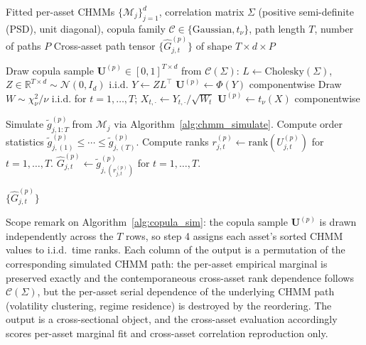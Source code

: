 \begin{algorithm}[tp]
\caption{Cross-asset copula simulation via rank reordering}
\label{alg:copula_sim}
\small
\begin{algorithmic}[1]
\REQUIRE Fitted per-asset CHMMs $\{\mathcal{M}_j\}_{j=1}^d$, correlation matrix $\Sigma$ (positive semi-definite (PSD), unit diagonal), copula family $\mathcal{C} \in \{\text{Gaussian}, t_\nu\}$, path length $T$, number of paths $P$
\ENSURE Cross-asset path tensor $\{\hat{G}^{(p)}_{j,t}\}$ of shape $T \times d \times P$


    \STATE Draw copula sample $\mathbf{U}^{(p)} \in [0,1]^{T \times d}$ from $\mathcal{C}(\Sigma)$:
    \STATE \quad $L \leftarrow \text{Cholesky}(\Sigma)$, \; $Z \in \mathbb{R}^{T \times d} \sim \mathcal{N}(0, I_d)$ i.i.d.
    \STATE \quad $Y \leftarrow Z L^\top$
        \STATE \quad $\mathbf{U}^{(p)} \leftarrow \Phi(Y)$ componentwise
    \ELSE
        \STATE \quad Draw $W \sim \chi^2_\nu / \nu$ i.i.d. for $t = 1, \dots, T$; \; $X_{t,\cdot} \leftarrow Y_{t,\cdot} / \sqrt{W_t}$
        \STATE \quad $\mathbf{U}^{(p)} \leftarrow t_\nu(X)$ componentwise
    \ENDIF

        \STATE Simulate $\tilde{g}_{j,1:T}^{(p)}$ from $\mathcal{M}_j$ via Algorithm~\ref{alg:chmm_simulate}.
        \STATE Compute order statistics $\tilde{g}_{j,(1)}^{(p)} \leq \cdots \leq \tilde{g}_{j,(T)}^{(p)}$.
        \STATE Compute ranks $r_{j,t}^{(p)} \leftarrow \text{rank}(U_{j,t}^{(p)})$ for $t = 1, \dots, T$.
        \STATE $\hat{G}_{j,t}^{(p)} \leftarrow \tilde{g}_{j,(r_{j,t}^{(p)})}^{(p)}$ for $t = 1, \dots, T$.
    \ENDFOR
\ENDFOR

\RETURN $\{\hat{G}^{(p)}_{j,t}\}$
\end{algorithmic}
\end{algorithm}

Scope remark on Algorithm~\ref{alg:copula_sim}: the copula sample $\mathbf{U}^{(p)}$ is drawn independently across the $T$ rows, so step 4 assigns each asset's sorted CHMM values to i.i.d.\ time ranks. Each column of the output is a permutation of the corresponding simulated CHMM path: the per-asset empirical marginal is preserved exactly and the contemporaneous cross-asset rank dependence follows $\mathcal{C}(\Sigma)$, but the per-asset serial dependence of the underlying CHMM path (volatility clustering, regime residence) is destroyed by the reordering. The output is a cross-sectional object, and the cross-asset evaluation accordingly scores per-asset marginal fit and cross-asset correlation reproduction only.

